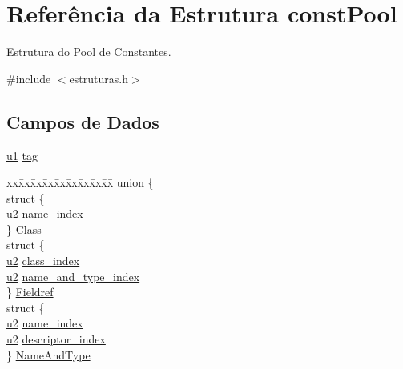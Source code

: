 \hypertarget{structconst_pool}{}\section{Referência da Estrutura const\+Pool}
\label{structconst_pool}


Estrutura do Pool de Constantes.  




{\ttfamily \#include $<$estruturas.\+h$>$}

\subsection*{Campos de Dados}
\begin{DoxyCompactItemize}
\item 
\hyperlink{estruturas_8h_a216a9f8b04b4f0af84a4ca9d1d85a6ca}{u1} \hyperlink{structconst_pool_a876197bb013e214c071ab56d1de8ed25}{tag}
\item 
\begin{tabbing}
xx\=xx\=xx\=xx\=xx\=xx\=xx\=xx\=xx\=\kill
union \{\\
\>struct \{\\
\>\>\hyperlink{estruturas_8h_a5f223212eef04d10a4550ded680cb1cf}{u2} \hyperlink{structconst_pool_af3f5f8cd6fcae23720d11786466944e1}{name\_index}\\
\>\} \hyperlink{structconst_pool_a3735adf769a89a8579d9c729d9ea852b}{Class}\\
\>struct \{\\
\>\>\hyperlink{estruturas_8h_a5f223212eef04d10a4550ded680cb1cf}{u2} \hyperlink{structconst_pool_ac2f1017863a461470285ceffa2487892}{class\_index}\\
\>\>\hyperlink{estruturas_8h_a5f223212eef04d10a4550ded680cb1cf}{u2} \hyperlink{structconst_pool_a3dde2ae699efaa1736b684038ea4f3de}{name\_and\_type\_index}\\
\>\} \hyperlink{structconst_pool_a2d445b84752ddea1db4ef9f3ce2fee02}{Fieldref}\\
\>struct \{\\
\>\>\hyperlink{estruturas_8h_a5f223212eef04d10a4550ded680cb1cf}{u2} \hyperlink{structconst_pool_af3f5f8cd6fcae23720d11786466944e1}{name\_index}\\
\>\>\hyperlink{estruturas_8h_a5f223212eef04d10a4550ded680cb1cf}{u2} \hyperlink{structconst_pool_a09a23db7ae9a3429931f2a5447f9f7fe}{descriptor\_index}\\
\>\} \hyperlink{structconst_pool_a727268ed0e1405a5eaab1aa5ad3cba74}{NameAndType}\\

\end{tabbing}
\end{DoxyCompactItemize}
